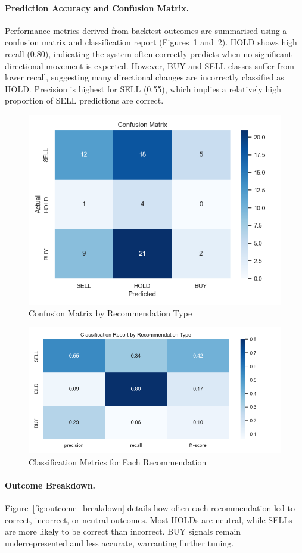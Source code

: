 \paragraph{Prediction Accuracy and Confusion Matrix.}  
Performance metrics derived from backtest outcomes are summarised using a confusion matrix and classification report (Figures~\ref{fig:conf_mat} and~\ref{fig:class_report}). HOLD shows high recall (0.80), indicating the system often correctly predicts when no significant directional movement is expected. However, BUY and SELL classes suffer from lower recall, suggesting many directional changes are incorrectly classified as HOLD. Precision is highest for SELL (0.55), which implies a relatively high proportion of SELL predictions are correct.

\begin{figure}[h]
  \centering
  \includegraphics[width=0.6\linewidth]{assets/confusion_matrix.png}
  \caption{Confusion Matrix by Recommendation Type}
  \label{fig:conf_mat}
\end{figure}

\begin{figure}[h]
  \centering
  \includegraphics[width=0.6\linewidth]{assets/classification_report_by_recommendation.png}
  \caption{Classification Metrics for Each Recommendation}
  \label{fig:class_report}
\end{figure}

\FloatBarrier

\paragraph{Outcome Breakdown.}  
Figure~\ref{fig:outcome_breakdown} details how often each recommendation led to correct, incorrect, or neutral outcomes. Most HOLDs are neutral, while SELLs are more likely to be correct than incorrect. BUY signals remain underrepresented and less accurate, warranting further tuning.

